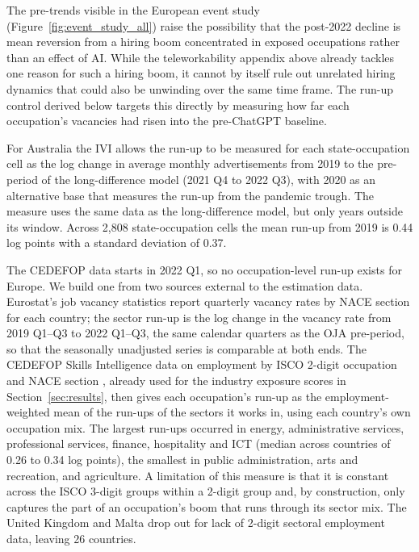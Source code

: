 \documentclass[11pt]{article}
\begin{document}
The pre-trends visible in the European event study (Figure~\ref{fig:event_study_all}) raise the possibility that the post-2022 decline is mean reversion from a hiring boom concentrated in exposed occupations rather than an effect of AI. While the teleworkability appendix above already tackles one reason for such a hiring boom, it cannot by itself rule out unrelated hiring dynamics that could also be unwinding over the same time frame. The run-up control derived below targets this directly by measuring how far each occupation's vacancies had risen into the pre-ChatGPT baseline.

For Australia the IVI allows the run-up to be measured for each state-occupation cell as the log change in average monthly advertisements from 2019 to the pre-period of the long-difference model (2021 Q4 to 2022 Q3), with 2020 as an alternative base that measures the run-up from the pandemic trough. The measure uses the same data as the long-difference model, but only years outside its window. Across 2,808 state-occupation cells the mean run-up from 2019 is 0.44 log points with a standard deviation of 0.37.

The CEDEFOP data starts in 2022 Q1, so no occupation-level run-up exists for Europe. We build one from two sources external to the estimation data. Eurostat's job vacancy statistics \citep{eurostat_jvs_q_nace2} report quarterly vacancy rates by NACE section for each country; the sector run-up is the log change in the vacancy rate from 2019 Q1--Q3 to 2022 Q1--Q3, the same calendar quarters as the OJA pre-period, so that the seasonally unadjusted series is comparable at both ends. The CEDEFOP Skills Intelligence data on employment by ISCO 2-digit occupation and NACE section \citep{skills_intelligence_tool}, already used for the industry exposure scores in Section~\ref{sec:results}, then gives each occupation's run-up as the employment-weighted mean of the run-ups of the sectors it works in, using each country's own occupation mix. The largest run-ups occurred in energy, administrative services, professional services, finance, hospitality and ICT (median across countries of 0.26 to 0.34 log points), the smallest in public administration, arts and recreation, and agriculture. A limitation of this measure is that it is constant across the ISCO 3-digit groups within a 2-digit group and, by construction, only captures the part of an occupation's boom that runs through its sector mix. The United Kingdom and Malta drop out for lack of 2-digit sectoral employment data, leaving 26 countries.
\end{document}
